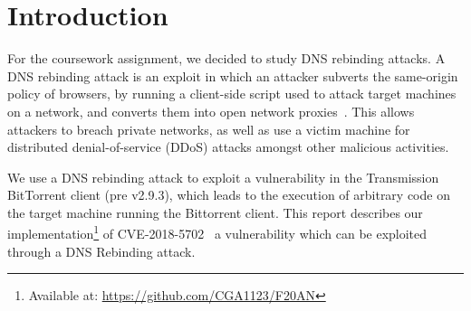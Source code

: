 \chapter{Introduction}

For the coursework assignment, we decided to study DNS rebinding attacks.
A DNS rebinding attack is an exploit in which an attacker subverts
the same-origin policy of browsers, by running a client-side script used to
attack target machines on a network, and converts them into open network
proxies~\cite{jackson2009protecting}. This allows attackers to
breach private networks, as well as use a victim machine for distributed
denial-of-service (DDoS) attacks amongst other malicious activities.

\vspace{0.5cm}

We use a DNS rebinding attack to exploit a vulnerability in the Transmission
BitTorrent client (pre v2.9.3), which leads to the execution of
arbitrary code on the target machine running the Bittorrent client. This report
describes our implementation\footnote{Available at:
\url{https://github.com/CGA1123/F20AN}} of CVE-2018-5702~\cite{cve20185702}
a vulnerability which can be exploited through a DNS Rebinding attack.

